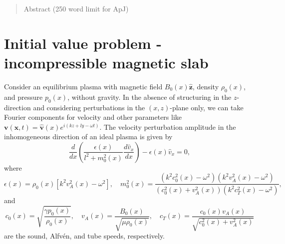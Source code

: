 \documentclass{aastex61}
\begin{document}

\author[0000-0002-0771-743X]{Matthew Allcock}

\author[0000-0003-3439-4127]{Robert Erd\'{e}lyi}


\begin{abstract}
	
	Abstract (250 word limit for ApJ)
	
\end{abstract}

	
\section{Initial value problem - incompressible magnetic slab}

Consider an equilibrium plasma with magnetic field $B_0(x)\mathbf{\hat{z}}$, density $\rho_0(x)$, and pressure $p_0(x)$, without gravity. In the absence of structuring in the $z$-direction and considering perturbations in the $(x,z)$-plane only, we can take Fourier components for velocity and other parameters like $\mathbf{v}(\mathbf{x},t) = \mathbf{\hat{v}}(x)e^{i(kz + ly - \omega t)}$. The velocity perturbation amplitude in the inhomogeneous direction of an ideal plasma is given by
\begin{equation}
\frac{d}{dx}\left(\frac{\epsilon(x)}{l^2 + m_0^2(x)} \frac{d\hat{v}_x}{dx}\right) - \epsilon(x)\hat{v}_x = 0,
\label{gov gen}
\end{equation}
where
\begin{equation}
\epsilon(x) = \rho_0(x)[k^2v_A^2(x)-\omega^2], \quad
m_0^2(x) = \frac{(k^2c_0^2(x) - \omega^2)(k^2v_A^2(x) - \omega^2)}{(c_0^2(x) + v_A^2(x))(k^2c_T^2(x) - \omega^2)},
\end{equation}
and
\begin{equation}
c_0(x) = \sqrt{\frac{\gamma p_0(x)}{\rho_0(x)}}, \quad
v_A(x) = \frac{B_0(x)}{\sqrt{\mu \rho_0(x)}}, \quad
c_T(x) = \frac{c_0(x)v_A(x)}{\sqrt{c_0^2(x) + v_A^2(x)}}
\end{equation} are the sound, Alfv\'{e}n, and tube speeds, respectively.
\end{document}
